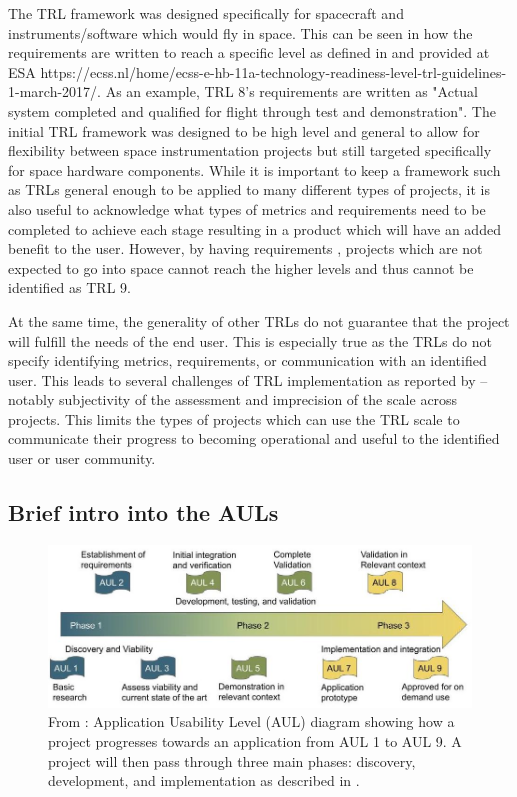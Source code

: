 \documentclass[referee,a4paper,12pt,traditabstract]{swsc}
\begin{document}
\begin{linenumbers}
The TRL framework was designed specifically for spacecraft and instruments/software which would fly in space. This can be seen in how the requirements are written to reach a specific level as defined in \citet{mankins1995technology} and provided at ESA https://ecss.nl/home/ecss-e-hb-11a-technology-readiness-level-trl-guidelines-1-march-2017/. As an example, TRL 8's requirements are written as "Actual system completed and qualified for flight through test and demonstration". The initial TRL framework was designed to be high level and general to allow for flexibility between space instrumentation projects but still targeted specifically for space hardware components. While it is important to keep a framework such as TRLs general enough to be applied to many different types of projects, it is also useful to acknowledge what types of metrics and requirements need to be completed to achieve each stage resulting in a product which will have an added benefit to the user. However, by having requirements , projects which are not expected to go into space cannot reach the higher levels and thus cannot be identified as TRL 9. 

At the same time, the generality of other TRLs do not guarantee that the project will fulfill the needs of the end user.
This is especially true as the TRLs do not specify identifying metrics, requirements, or communication with an identified user.
This leads to several challenges of TRL implementation as reported by \citet{Olechowski2015} -- notably  subjectivity of the assessment and imprecision of the scale across projects.  
This limits the types of projects which can use the TRL scale to communicate their progress to becoming operational and useful to the identified user or user community. 

\subsection{Brief intro into the AULs}
   
\begin{figure}
\centering\includegraphics[width=0.9\linewidth]{Fig_AUL.jpg}
\caption{From \citet{halford19}: Application Usability Level (AUL) diagram showing how a project progresses towards an application from AUL 1 to AUL 9. A project will then pass through three main phases: discovery, development, and implementation as described in \citet{halford19}.}\label{Fig_AUL}
\end{figure}


\end{linenumbers}
\end{document}
